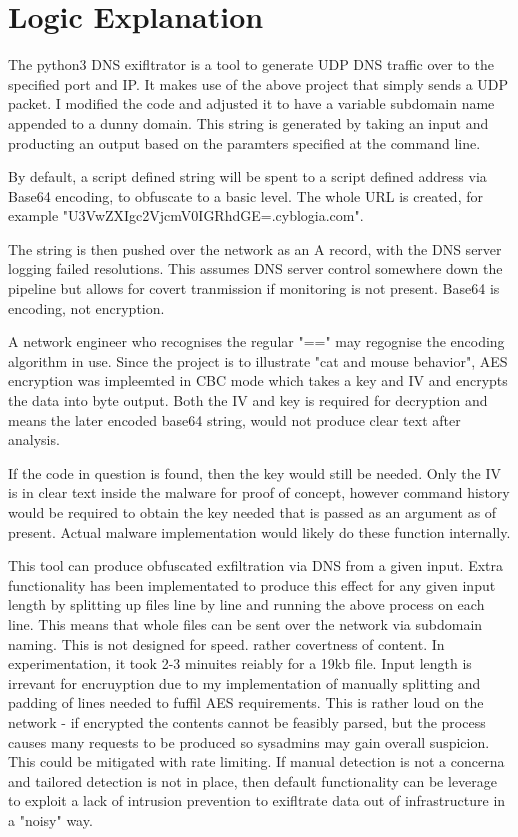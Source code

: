 \section{Logic Explanation}
The python3 DNS exifltrator is a tool to generate UDP DNS traffic over to the specified port and IP. It makes use of the above project that simply sends a UDP packet. I modified the code and adjusted it to have a variable subdomain name appended to a dunny domain.
This string is generated by taking an input and producting an output based on the paramters specified at the command line. 

By default, a script defined string will be spent to a script defined address via Base64 encoding, to obfuscate to a basic level. The whole URL is created,
for example "U3VwZXIgc2VjcmV0IGRhdGE=.cyblogia.com". 

The string is then pushed over the network as an A record, with the DNS server logging failed resolutions. This assumes DNS server control somewhere down the pipeline but allows for covert tranmission if monitoring is not present.
Base64 is encoding, not encryption. 

A network engineer who recognises the regular "==" may regognise the encoding algorithm in use. Since the project is to illustrate "cat and mouse behavior", AES encryption was impleemted in CBC mode which takes a key and IV and encrypts the data into byte output.
Both the IV and key is required for decryption and means the later encoded base64 string, would not produce clear text after analysis. 

If the code in question is found, then the key would still be needed. Only the IV is in clear text inside the malware for proof of concept, however command history would be required to obtain the key needed that is passed as an argument as of present. 
Actual malware implementation would likely do these function internally. 


This tool can produce obfuscated exfiltration via DNS from a given input. Extra functionality has been implementated to produce this effect for any given input length by splitting up files line by line and running the above process on each line. This means that whole files can be sent over the network via subdomain naming. This is not designed for speed. rather covertness of content. 
In experimentation, it took 2-3 minuites reiably for a 19kb file. Input length is irrevant for encruyption due to my implementation of manually splitting and padding of lines needed to fuffil AES requirements. This is rather loud on the network - if encrypted the contents cannot be feasibly parsed, but the process causes many requests to be produced so sysadmins may gain overall suspicion.
This could be mitigated with rate limiting. If manual detection is not a concerna and tailored detection is not in place, then default functionality can be leverage to exploit a lack of intrusion prevention to exifltrate data out of infrastructure in a "noisy" way.

